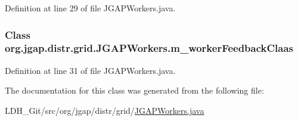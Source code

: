 Definition at line 29 of file J\-G\-A\-P\-Workers.\-java.

\hypertarget{classorg_1_1jgap_1_1distr_1_1grid_1_1_j_g_a_p_workers_a1d42ad82110d1b56df8b05f29ccee27c}{
\subsubsection[{m\-\_\-worker\-Feedback\-Claas}]{\setlength{\rightskip}{0pt plus 5cm}Class org.\-jgap.\-distr.\-grid.\-J\-G\-A\-P\-Workers.\-m\-\_\-worker\-Feedback\-Claas\hspace{0.3cm}{\ttfamily [private]}}}\label{classorg_1_1jgap_1_1distr_1_1grid_1_1_j_g_a_p_workers_a1d42ad82110d1b56df8b05f29ccee27c}


Definition at line 31 of file J\-G\-A\-P\-Workers.\-java.



The documentation for this class was generated from the following file\-:\begin{DoxyCompactItemize}
\item 
L\-D\-H\-\_\-\-Git/src/org/jgap/distr/grid/\hyperlink{_j_g_a_p_workers_8java}{J\-G\-A\-P\-Workers.\-java}\end{DoxyCompactItemize}
